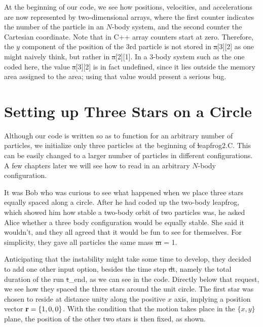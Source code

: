 At the beginning of our code, we see how positions, velocities, and
accelerations are now represented by two-dimensional arrays, where the
first counter indicates the number of the particle in an $N$-body
system, and the second counter the Cartesian coordinate.  Note that in
C++ array counters start at zero.  Therefore, the $y$ component of the
position of the 3rd particle is not stored in {\st a[3][2]} as one might
naively think, but rather in {\st a[2][1]}.  In a 3-body system such as
the one coded here, the value {\st a[3][2]} is in fact undefined, since it
lies outside the memory area assigned to the area; using that value
would present a serious bug.

\section{Setting up Three Stars on a Circle}

Although our code is written so as to function for an arbitrary number
of particles, we initialize only three particles at the beginning of
{\st leapfrog2.C}.  This can be easily changed to a larger number of
particles in different configurations.  A few chapters later we will
see how to read in an arbitrary $N$-body configuration.

It was Bob who was curious to see what happened when we place three
stars equally spaced along a circle.  After he had coded up the
two-body leapfrog, which showed him how stable a two-body orbit of two
particles was, he asked Alice whether a three body configuration would
be equally stable.  She said it wouldn't, and they all agreed that it
would be fun to see for themselves.  For simplicity, they gave all
particles the same mass {\st m = 1}.

Anticipating that the instability might take some time to develop,
they decided to add one other input option, besides the time step {\st
dt}, namely the total duration of the run {\st t\_end}, as we can see
in the code.  Directly below that request, we see how they spaced the
three stars around the unit circle.  The first star was chosen to
reside at distance unity along the positive $x$ axis, implying a
position vector ${\bf r} = \{1,0,0\}$.  With the condition that the motion
takes place in the $\{x,y\}$ plane, the position of the other two
stars is then fixed, as shown.

